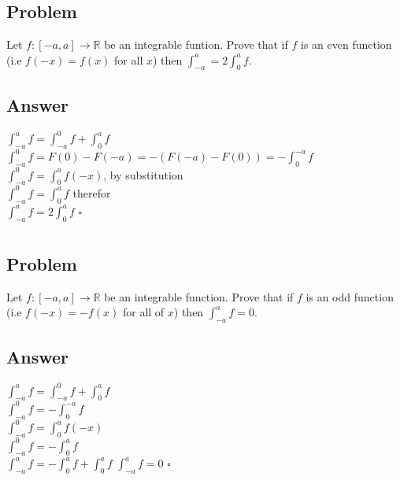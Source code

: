 \documentclass{article}
\newcommand\tab[1][1cm]{\hspace*{#1}}
\begin{document}
\section{}

\subsection*{Problem}
Let \(f: [-a,a] \to \mathbb{R}\) be an integrable funtion. Prove that if 
\(f\) is an even function (i.e \(f(-x) = f(x)\) for all \(x\)) then 
\(\int^{a}_{-a} = 2\int^{a}_{0}f.\)

\subsection*{Answer}
\(\int^{a}_{-a}f = \int^{0}_{-a}f + \int^{a}_{0}f\) \\
\(\int^{0}_{-a}f = F(0) - F(-a) = -(F(-a) - F(0)) = -\int^{-a}_{0}f\)\\
\(\int^{0}_{-a}f = \int^{a}_{0}f(-x)\), by substitution \\
\(\int^{0}_{-a}f = \int^{a}_{0}f\) therefor \\
\(\int^{a}_{-a}f = 2\int^{a}_{0}f\) \tab \(\square\)


\section{}

\subsection*{Problem}
Let \(f:[-a,a] \to \mathbb{R}\) be an integrable function. Prove that if 
\(f\) is an odd function (i.e \(f(-x) = -f(x)\) for all of \(x\)) then 
\(\int^{a}_{-a}f = 0.\)

\subsection*{Answer}
\(\int^{a}_{-a}f = \int^{0}_{-a}f + \int^{a}_{0}f\) \\
\(\int^{0}_{-a}f = -\int^{-a}_{0}f\) \\
\(\int^{0}_{-a}f = \int^{a}_{0}f(-x)\) \\
\(\int^{0}_{-a}f = -\int^{a}_{0}f\) \\
\(\int^{a}_{-a}f = -\int^{a}_{0}f + \int^{a}_{0}f\) 
\(\int^{a}_{-a}f = 0\) \tab \(\square\)

\section{}
\end{document}
